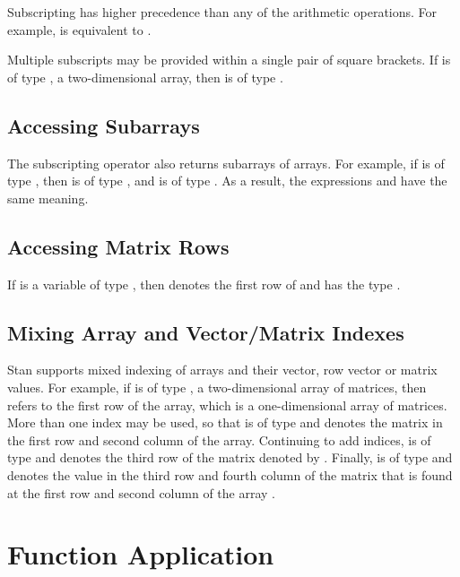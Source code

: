 Subscripting has higher precedence than any of the arithmetic
operations.  For example,  is equivalent to
.  

Multiple subscripts may be provided within a single pair of square
brackets.  If  is of type , a two-dimensional
array, then  is of type .

\subsection{Accessing Subarrays}

The subscripting operator also returns subarrays of arrays.  For
example, if  is of type , then 
is of type , and  is of type
.  As a result, the expressions  and
 have the same meaning.  

\subsection{Accessing Matrix Rows}

If  is a variable of type , then
 denotes the first row of  and has the
type .  

\subsection{Mixing Array and Vector/Matrix Indexes}

Stan supports mixed indexing of arrays and their vector, row vector
or matrix values.  For example, if  is of type
, a two-dimensional array of matrices, then
 refers to the first row of the array, which is a
one-dimensional array of matrices.  More than one index may be used,
so that  is of type  and denotes the matrix
in the first row and second column of the array.  Continuing to add
indices,  is of type  and denotes
the third row of the matrix denoted by .  Finally,
 is of type  and denotes the value in the
third row and fourth column of the matrix that is found at the first
row and second column of the array .

\section{Function Application}\label{function-application.section}


